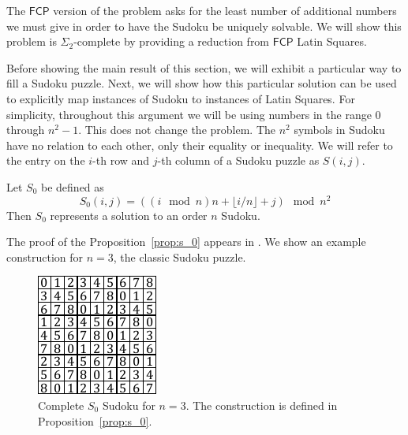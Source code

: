 \documentclass[runningheads,a4paper]{llncs}
\begin{document}
The $\mathsf{FCP}$ version of the problem asks for the least number of additional numbers we must give in order to have the Sudoku be uniquely solvable. We will show this problem is $\Sigma_2$-complete by providing a reduction from $\mathsf{FCP}$ Latin Squares. 

Before showing the main result of this section, we will exhibit a particular way to fill a Sudoku puzzle. Next, we will show how this particular solution can be used to explicitly map instances of Sudoku to instances of Latin Squares. For simplicity, throughout this argument we will be using numbers in the range $0$ through $n^2 - 1$. This does not change the problem. The $n^2$ symbols in Sudoku have no relation to each other, only their equality or inequality. We will refer to the entry on the $i$-th row and $j$-th column of a Sudoku puzzle as $S(i,j)$.

\begin{proposition}
\label{prop:s_0}
Let $S_0$ be defined as
\[ S_0 (i,j) = ((i \mod n) n + \lfloor i/n \rfloor + j) \mod n^2 \]
Then $S_0$ represents a solution to an order $n$ Sudoku.
\end{proposition}

The proof of the Proposition~\ref{prop:s_0} appears in \cite{takayaki2003complexity}. We show an example construction for $n=3$, the classic Sudoku puzzle.

\begin{figure}
\centering
\label{fig:s_0}
\includegraphics[width=0.6\linewidth]{sudoku_s_0.pdf}
\caption{Complete $S_0$ Sudoku for $n = 3$. The construction is defined in Proposition~\ref{prop:s_0}.}
\end{figure}
\end{document}
